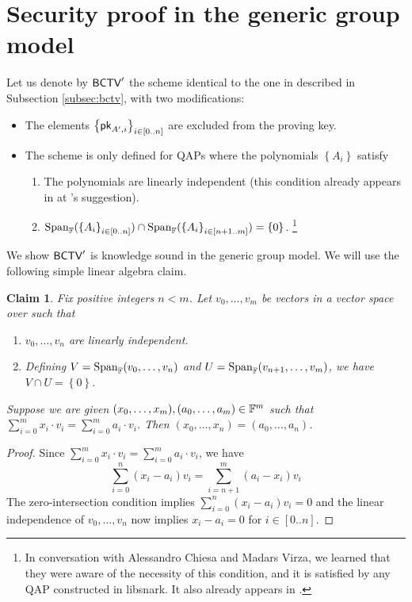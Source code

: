 \documentclass[11pt]{article}
\numberwithin{equation}{section} %
\numberwithin{figure}{section} %
\newtheorem{claim}[thm]{Claim}
\newcommand{\set}[1]{\ensuremath{\left\{#1\right\}}\xspace}
\begin{document}
 \renewcommand{\span}[1]{\ensuremath{\mathrm{Span}_{\F}(#1)}\xspace}
 \newcommand{\bctvprime}{\ensuremath{\bctv'}\xspace}
\section{Security proof in the generic group model}\label{sec:ggmproof}
Let us denote by \bctvprime the scheme identical to the one in \cite{BCTV} described in Subsection \ref{subsec:bctv},
with two modifications:
\begin{itemize}
 \item The elements $\sett{\pk_{A',i}}{i\in [0..n]}$ are excluded from the proving key.
 \item The scheme is only defined for QAPs where the polynomials \set{A_i} satisfy
   \begin{enumerate}
    \item The polynomials  are linearly independent (this condition already appears in \cite{BCTV} at \cite{Parno15}'s suggestion).
    \item $\span{\sett{A_i}{i\in[0..n]}}\cap \span{\sett{A_i}{i\in [n+1..m]}}=\set{0}$. \footnote{In conversation with Alessandro Chiesa and Madars Virza, we  learned that they were aware of the necessity of this condition, and it is satisfied by any QAP constructed in libsnark\cite{libsnark}. It also already appears in \cite{BGG}.}
   \end{enumerate}

\end{itemize}

We show \bctvprime is knowledge sound in the generic group model.
We will use the following simple linear algebra claim.
\begin{claim}\label{clm:independence}
 Fix positive integers $n<m$. Let $v_0,\ldots,v_m$ be vectors in a vector space over \F such that
 \begin{enumerate}
  \item $v_0,\ldots,v_n$ are linearly independent.
  \item Defining $V = \span{v_0,\ldots,v_n}$ and $U=\span{v_{n+1},\ldots,v_m}$, we have $V\cap U =\set{0}$.
 \end{enumerate}
Suppose we are given $(x_0,\ldots,x_m),(a_0,\ldots,a_m)\in \mathbb F^m$ such that $\sum_{i=0}^m x_i\cdot v_i = \sum_{i=0}^m a_i\cdot v_i$.
Then $(x_0,\ldots,x_n) = (a_0,\ldots,a_n)$.
\end{claim}
\begin{proof}
 Since $\sum_{i=0}^m x_i\cdot v_i = \sum_{i=0}^m a_i\cdot v_i$,
 we have
 \[\sum_{i=0}^n (x_i-a_i) v_i = \sum_{i=n+1}^m (a_i-x_i)v_i\]
 The zero-intersection condition implies $\sum_{i=0}^n (x_i-a_i) v_i=0 $
 and the linear independence of $v_0,\ldots,v_n$ now implies
 $x_i-a_i=0$ for $i\in [0..n]$.
 
\end{proof}
\end{document}
